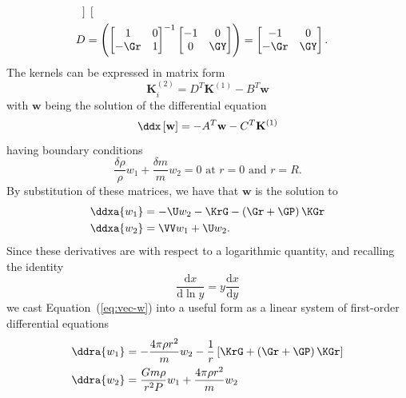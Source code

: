 \begin{description}
\begin{align}
\begin{bmatrix}
  \end{bmatrix} \\
D &= \left(
  \begin{bmatrix}
    1 & 0 \\
    -\Gr & 1
  \end{bmatrix}^{-1}
  \begin{bmatrix}
    -1 & 0 \\
    0 & \GY
  \end{bmatrix} \right)
= \begin{bmatrix}
    -1 & 0 \\
    -\Gr & \GY
  \end{bmatrix}.
\end{align}
The kernels can be expressed in matrix form
\begin{equation} \label{eq:vec-k}
    \mathbf K^{(2)}_i = D^T \mathbf K^{(1)} - B^T \mathbf w
\end{equation}
with $\mathbf w$ being the solution of the differential equation %
\begin{equation} \label{eq:vec-w}
    \ddx \left[ \mathbf w \right] = -A^T \mathbf w - C^T \mathbf K^{(1)}
\end{equation}
having boundary conditions %
\begin{equation} \label{eq:bvs2}
    \frac{\delta \rho}{\rho} w_1 + \frac{\delta m}{m} w_2 = 0 \text{ at } r=0 \text{ and } r=R.
\end{equation}
By substitution of these matrices, we have that $\mathbf w$ is the solution to 
\begin{align}
    \ddxa{w_1} &= -\U w_2 - \KrG - \left( \Gr + \GP \right) \KGr \\
    \ddxa{w_2} &= \VV w_1 + \U w_2.
\end{align}
Since these derivatives are with respect to a logarithmic quantity, and recalling the identity
\begin{equation}
    \frac{\text{d}x}{\text{d}\ln y} = y\frac{\text{d}x}{\text{d}y} %
\end{equation}
we cast Equation~(\ref{eq:vec-w}) into a useful form as a linear system of first-order differential equations 
\begin{align}
    \ddra{w_1} &= -\frac{4\pi\rho r^2}{m} w_2 - \frac{1}{r} \left[ \KrG + \left( \Gr + \GP \right) \KGr \right] \\
    \ddra{w_2} &= \frac{G m \rho}{r^2P} w_1 + \frac{4\pi\rho r^2}{m} w_2

\end{align}
\end{description}
